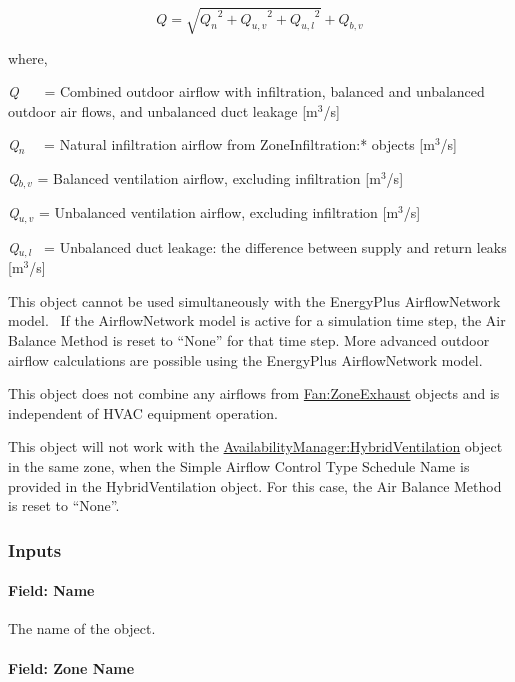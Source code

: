 \begin{equation}
Q = \sqrt {{Q_n}^2 + {Q_{u,v}}^2 + {Q_{u,l}}^2}  + {Q_{b,v}}
\end{equation}

where,

\emph{Q}~~~ = Combined outdoor airflow with infiltration, balanced and unbalanced outdoor air flows, and unbalanced duct leakage {[}m\(^{3}\)/s{]}

\emph{Q\(_{n}\)}~~ = Natural infiltration airflow from ZoneInfiltration:* objects {[}m\(^{3}\)/s{]}

\emph{Q\(_{b,v}\)} = Balanced ventilation airflow, excluding infiltration {[}m\(^{3}\)/s{]}

\emph{Q\(_{u,v}\)} = Unbalanced ventilation airflow, excluding infiltration {[}m\(^{3}\)/s{]}

\emph{Q\(_{u,l}\)}~ = Unbalanced duct leakage: the difference between supply and return leaks {[}m\(^{3}\)/s{]}

This object cannot be used simultaneously with the EnergyPlus AirflowNetwork model.~ If the AirflowNetwork model is active for a simulation time step, the Air Balance Method is reset to ``None'' for that time step. More advanced outdoor airflow calculations are possible using the EnergyPlus AirflowNetwork model.

This object does not combine any airflows from \hyperref[fanzoneexhaust]{Fan:ZoneExhaust} objects and is independent of HVAC equipment operation.

This object will not work with the \hyperref[availabilitymanagerhybridventilation]{AvailabilityManager:HybridVentilation} object in the same zone, when the Simple Airflow Control Type Schedule Name is provided in the HybridVentilation object. For this case, the Air Balance Method is reset to ``None''.

\subsubsection{Inputs}\label{inputs-4-004}

\paragraph{Field: Name}\label{field-name-4-004}

The name of the object.

\paragraph{Field: Zone Name}\label{field-zone-name-2}


